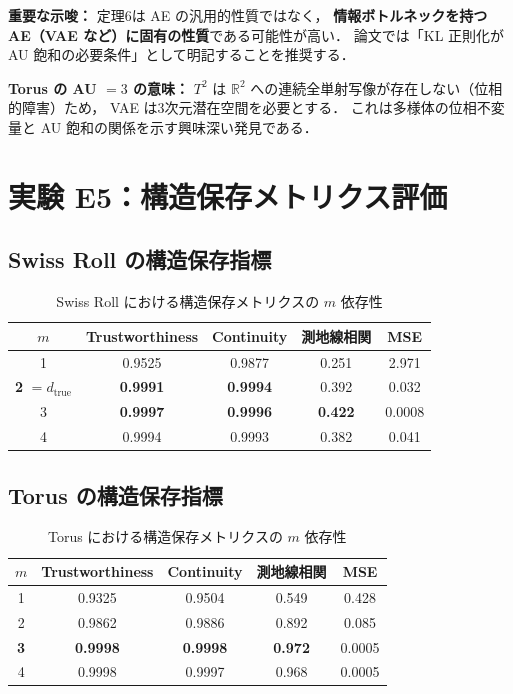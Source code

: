 \documentclass[12pt,a4paper]{ltjsarticle}  %
\newcommand{\dtrue}{d_{\mathrm{true}}}
\begin{document}
\textbf{重要な示唆：}
定理6は AE の汎用的性質ではなく，
\textbf{情報ボトルネックを持つ AE（VAE など）に固有の性質}である可能性が高い．
論文では「KL 正則化が AU 飽和の必要条件」として明記することを推奨する．

\textbf{Torus の AU $= 3$ の意味：}
$T^2$ は $\mathbb{R}^2$ への連続全単射写像が存在しない（位相的障害）ため，
VAE は3次元潜在空間を必要とする．
これは多様体の位相不変量と AU 飽和の関係を示す興味深い発見である．

\section{実験 E5：構造保存メトリクス評価}

\subsection{Swiss Roll の構造保存指標}

\begin{table}[H]
  \centering
  \caption{Swiss Roll における構造保存メトリクスの $m$ 依存性}
  \label{tab:e5_swiss}
  \renewcommand{\arraystretch}{1.2}
  \begin{tabular}{ccccc}
    \toprule
    $m$ & Trustworthiness & Continuity & 測地線相関 & MSE \\
    \midrule
    1                       & 0.9525 & 0.9877 & 0.251 & 2.971 \\
    \textbf{2} $= \dtrue$   & \textbf{0.9991} & \textbf{0.9994} & 0.392 & 0.032 \\
    3                       & \textbf{0.9997} & \textbf{0.9996} & \textbf{0.422} & 0.0008 \\
    4                       & 0.9994 & 0.9993 & 0.382 & 0.041 \\
    \bottomrule
  \end{tabular}
\end{table}

\subsection{Torus の構造保存指標}

\begin{table}[H]
  \centering
  \caption{Torus における構造保存メトリクスの $m$ 依存性}
  \label{tab:e5_torus}
  \renewcommand{\arraystretch}{1.2}
  \begin{tabular}{ccccc}
    \toprule
    $m$ & Trustworthiness & Continuity & 測地線相関 & MSE \\
    \midrule
    1         & 0.9325 & 0.9504 & 0.549 & 0.428 \\
    2         & 0.9862 & 0.9886 & 0.892 & 0.085 \\
    \textbf{3} & \textbf{0.9998} & \textbf{0.9998} & \textbf{0.972} & 0.0005 \\
    4         & 0.9998 & 0.9997 & 0.968 & 0.0005 \\
    \bottomrule
  \end{tabular}
\end{table}
\end{document}
